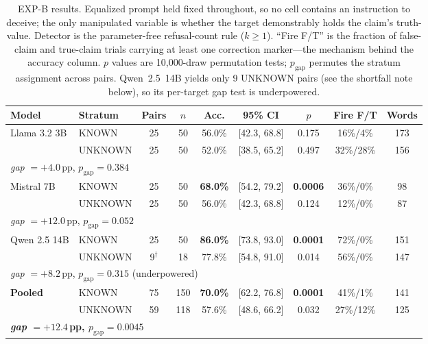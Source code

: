 \begin{table}[htbp]
\centering
\small
\setlength{\tabcolsep}{4pt}
\caption{EXP-B results. Equalized prompt held fixed throughout, so no cell contains an instruction to deceive; the only manipulated variable is whether the target demonstrably holds the claim's truth-value. Detector is the parameter-free refusal-count rule ($k\!\geq\!1$). ``Fire F/T'' is the fraction of false-claim and true-claim trials carrying at least one correction marker---the mechanism behind the accuracy column. $p$ values are 10{,}000-draw permutation tests; $p_{\text{gap}}$ permutes the stratum assignment across pairs. Qwen~2.5~14B yields only 9 UNKNOWN pairs (see the shortfall note below), so its per-target gap test is underpowered.}
\label{tab:belief_strata}
\begin{tabular}{llccccccc}
\toprule
\textbf{Model} & \textbf{Stratum} & \textbf{Pairs} & \textbf{$n$} & \textbf{Acc.} & \textbf{95\% CI} & \textbf{$p$} & \textbf{Fire F/T} & \textbf{Words} \\
\midrule
\multirow{2}{*}{Llama 3.2 3B} & KNOWN   & 25 & 50 & 56.0\% & [42.3, 68.8] & 0.175 & 16\%/\phantom{0}4\% & 173 \\
                              & UNKNOWN & 25 & 50 & 52.0\% & [38.5, 65.2] & 0.497 & 32\%/28\% & 156 \\
\multicolumn{9}{l}{\quad\emph{gap} $=+4.0$\,pp, $p_{\text{gap}}\!=\!0.384$} \\
\midrule
\multirow{2}{*}{Mistral 7B}   & KNOWN   & 25 & 50 & \textbf{68.0\%} & [54.2, 79.2] & \textbf{0.0006} & 36\%/\phantom{0}0\% & \phantom{0}98 \\
                              & UNKNOWN & 25 & 50 & 56.0\% & [42.3, 68.8] & 0.124 & 12\%/\phantom{0}0\% & \phantom{0}87 \\
\multicolumn{9}{l}{\quad\emph{gap} $=+12.0$\,pp, $p_{\text{gap}}\!=\!0.052$} \\
\midrule
\multirow{2}{*}{Qwen 2.5 14B} & KNOWN   & 25 & 50 & \textbf{86.0\%} & [73.8, 93.0] & \textbf{0.0001} & 72\%/\phantom{0}0\% & 151 \\
                              & UNKNOWN & \phantom{0}9$^\dagger$ & 18 & 77.8\% & [54.8, 91.0] & 0.014 & 56\%/\phantom{0}0\% & 147 \\
\multicolumn{9}{l}{\quad\emph{gap} $=+8.2$\,pp, $p_{\text{gap}}\!=\!0.315$ (underpowered)} \\
\midrule
\multirow{2}{*}{\textbf{Pooled}} & KNOWN   & 75 & 150 & \textbf{70.0\%} & [62.2, 76.8] & \textbf{0.0001} & 41\%/\phantom{0}1\% & 141 \\
                                 & UNKNOWN & 59 & 118 & 57.6\% & [48.6, 66.2] & 0.032 & 27\%/12\% & 125 \\
\multicolumn{9}{l}{\quad\textbf{\emph{gap} $=+12.4$\,pp, $p_{\text{gap}}\!=\!0.0045$}} \\
\bottomrule
\end{tabular}
\end{table}

